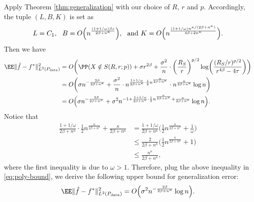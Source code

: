     Apply Theorem \ref{thm:generalization} with our choice of $R$, $r$ and $p$. Accordingly, the tuple $(L,B,K)$ is set as
    \begin{equation*}
        L= C_1,~~B=O\Bigl(n^{\frac{(1+1/\omega)\beta s}{2\beta+ n^\kappa } } \Bigr), ~~ \text{and}~K=O\Bigl(n^{\frac{(1+1/\omega) n^{\kappa/(2\beta+n^\kappa)}}{4\beta + 2n^\kappa}} \Bigr).
    \end{equation*}
    Then we have
    \begin{equation}\label{eq:poly-bound}
    \begin{split}
        \EE \norm{ \hat{f} - f^*}^2_{L^2(P_{\rm data})} &= O\biggl(  \PP(X \notin S(R,r;p) ) + \sigma  r^{2\beta} + \frac{\sigma^2}{n} \cdot \biggl(\frac{R_S}{r} \biggr)^{p/2} \log\biggl( \frac{(R_S/r)^{p/2}}{ r^{4\beta}-4\tau}\biggr) \biggr)\\
        &= O\biggl(\sigma n^{- \frac{2\beta}{2\beta+ n^\kappa}} + \frac{\sigma ^2}{n} \cdot n^{ \frac{1+1/\omega}{2\beta+ n^\kappa}\cdot\frac{1}{2}{n^{\frac{\kappa}{2\beta+ n^\kappa}}}} \cdot n^{\frac{\kappa}{2\beta+ n^\kappa}} \log n\biggr)\\
        &= O\Bigl( \sigma  n^{- \frac{2\beta}{2\beta+ n^\kappa}} + \sigma^2 n^{-1+ \frac{1+1/\omega}{2\beta+ n^\kappa}\cdot\frac{1}{2}{n^{\frac{\kappa}{2\beta+ n^\kappa}}} + \frac{\kappa}{2\beta+ n^\kappa}} \log n\Bigr).
    \end{split}
    \end{equation}
    Notice that
    \begin{align*}
        \frac{1+1/\omega}{2\beta+ n^\kappa}\cdot\frac{1}{2}{n^{\frac{\kappa}{2\beta+ n^\kappa}}} + \frac{\kappa}{2\beta+ n^\kappa} &= \frac{1+1/\omega}{2\beta+ n^\kappa} \biggl( \frac{1}{2}{n^{\frac{\kappa}{2\beta+ n^\kappa}}} + \frac{1}{\omega}   \biggr) \\
        & \leq \frac{2}{2\beta+ n^\kappa} \biggl( \frac{1}{2}{n^{\frac{\kappa}{2\beta+ n^\kappa}}} +1 \biggr) \\
        &\leq \frac{n^\kappa}{2\beta+ n^\kappa} , 
    \end{align*}
    where the first inequality is due to $\omega>1$. Therefore, plug the above inequality in \eqref{eq:poly-bound}, we derive the following upper bound for generalization error:
    \begin{align*}
         \EE \norm{ \hat{f} - f^*}^2_{L^2(P_{\rm data})} = O\Bigl( \sigma^2 n^{- \frac{2\beta}{2\beta+ n^\kappa}} \log n\Bigr).
    \end{align*}






